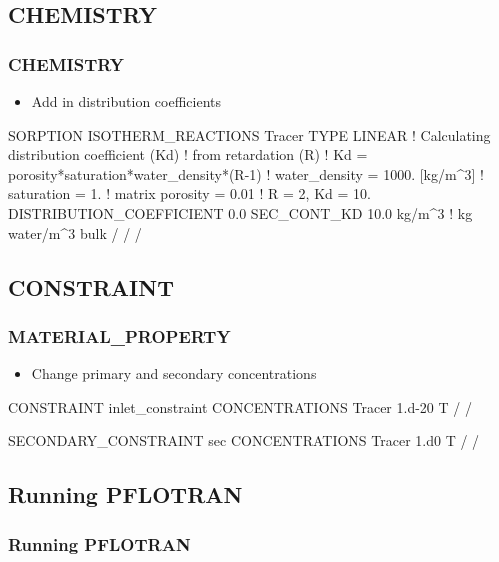 \documentclass{beamer}
\newcommand\bluecomment[1]{{{\color{blue} #1}}}
\newcommand\magentacomment[1]{{{\color{magenta} #1}}}
\begin{document}
\subsection{CHEMISTRY}

\begin{frame}[fragile]\frametitle{CHEMISTRY}

\begin{itemize}
\item Add in distribution coefficients
\end{itemize}

\begin{semiverbatim}
SORPTION
  ISOTHERM_REACTIONS
    Tracer
      TYPE LINEAR   
      \bluecomment{! Calculating distribution coefficient (Kd)
      ! from retardation (R)
      !   Kd = porosity*saturation*water_density*(R-1)
      !   water_density = 1000. [kg/m^3]
      !   saturation = 1. 
      !   matrix porosity = 0.01 
      ! R = 2, Kd = 10.}
      DISTRIBUTION_COEFFICIENT 0.0 
      SEC_CONT_KD 10.0 kg/m^3   \bluecomment{! kg water/m^3 bulk}
    /
  /
/
\end{semiverbatim}

\end{frame}

\subsection{CONSTRAINT}

\begin{frame}[fragile]\frametitle{MATERIAL\_PROPERTY}

\begin{itemize}
\item Change primary and secondary concentrations
\end{itemize}

\begin{semiverbatim}
CONSTRAINT inlet_constraint
  CONCENTRATIONS
    Tracer  \magentacomment{1.d-20}  T
  /
/

SECONDARY_CONSTRAINT sec
  CONCENTRATIONS
    Tracer  \magentacomment{1.d0}  T 
  /
/
  
\end{semiverbatim}

\end{frame}


\subsection{Running PFLOTRAN}

\begin{frame}[fragile]\frametitle{Running PFLOTRAN}


\end{frame}
\end{document}
